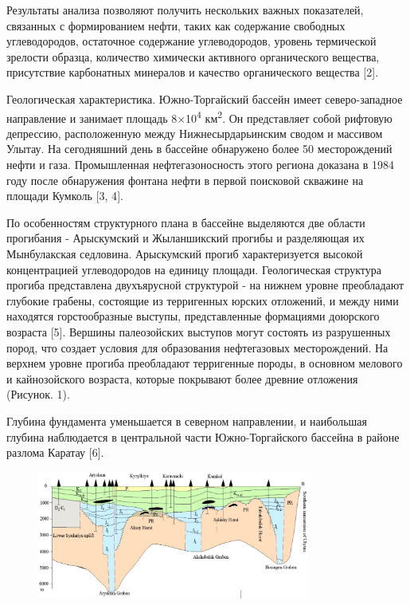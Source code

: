 Результаты анализа позволяют получить нескольких важных показателей,
связанных с формированием нефти, таких как содержание свободных
углеводородов, остаточное содержание углеводородов, уровень термической
зрелости образца, количество химически активного органического вещества,
присутствие карбонатных минералов и качество органического вещества
{[}2{]}.

Геологическая характеристика. Южно-Торгайский бассейн имеет
северо-западное направление и занимает площадь 8×10\textsuperscript{4}
км\textsuperscript{2}. Он представляет собой рифтовую депрессию,
расположенную между Нижнесырдарьинским сводом и массивом Улытау. На
сегодняшний день в бассейне обнаружено более 50 месторождений нефти и
газа. Промышленная нефтегазоносность этого региона доказана в 1984 году
после обнаружения фонтана нефти в первой поисковой скважине на площади
Кумколь {[}3, 4{]}.

По особенностям структурного плана в бассейне выделяются две области
прогибания - Арыскумский и Жыланшикский прогибы и разделяющая их
Мынбулакская седловина. Арыскумский прогиб характеризуется высокой
концентрацией углеводородов на единицу площади. Геологическая структура
прогиба представлена двухъярусной структурой - на нижнем уровне
преобладают глубокие грабены, состоящие из терригенных юрских отложений,
и между ними находятся горстообразные выступы, представленные формациями
доюрского возраста {[}5{]}. Вершины палеозойских выступов могут состоять
из разрушенных пород, что создает условия для образования нефтегазовых
месторождений. На верхнем уровне прогиба преобладают терригенные породы,
в основном мелового и кайнозойского возраста, которые покрывают более
древние отложения (Рисунок. 1).

Глубина фундамента уменьшается в северном направлении, и наибольшая
глубина наблюдается в центральной части Южно-Торгайского бассейна в
районе разлома Каратау {[}6{]}.

\begin{figure}[H]
	\centering
	\includegraphics[width=0.8\textwidth]{assets/1258}
	\caption*{}
\end{figure}

